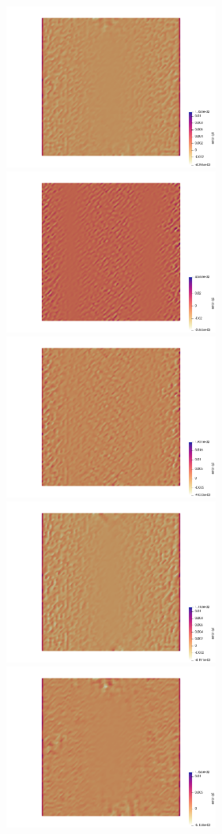 \begin{center}
\includegraphics[width=7cm]{python_codes/fieldstone_12/results/rand/erq1}
\includegraphics[width=7cm]{python_codes/fieldstone_12/results/rand/erq2}\\
\includegraphics[width=7cm]{python_codes/fieldstone_12/results/rand/erq3}
\includegraphics[width=7cm]{python_codes/fieldstone_12/results/rand/erq4}\\
\includegraphics[width=7cm]{python_codes/fieldstone_12/results/rand/erq5}

\end{center}
